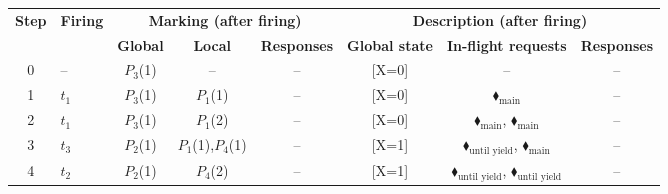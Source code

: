 \begin{table}[!htbp]
	\centering
	\label{tab:reach-seq}
	\begin{tabular}{c l c c c c c c}
		\toprule
		\textbf{Step} 
		& \textbf{Firing} 
		& \multicolumn{3}{c}{\textbf{Marking (after firing)}} 
		& \multicolumn{3}{c}{\textbf{Description (after firing)}} \\
		\cmidrule(lr){3-5} \cmidrule(lr){6-8}
		& 
		& \textbf{Global} 
		& \textbf{Local} 
		& \textbf{Responses} 
		& \textbf{Global state} 
		& \textbf{In-flight requests} 
		& \textbf{Responses} \\
		\midrule
		0 & --                                  
		& {\color{blue}$P_3$(1)}                  
		& --                                    
		& --                                    
		& {\color{blue}[X=0]}                   
		& --                          
		& --                                    \\
		1 & $t_1$ 
		& {\color{blue}$P_3$(1)}                  
		& $P_1$(1)                                
		& --                                    
		& {\color{blue}[X=0]}                   
		& {\color{ForestGreen}$\blacklozenge_\text{main}$} 
		& --                                    \\
		2 & $t_1$ 
		& {\color{blue}$P_3$(1)}                  
		& $P_1$(2)                                
		& --                                    
		& {\color{blue}[X=0]}                   
		& {\color{ForestGreen}$\blacklozenge_\text{main}$}, {\color{ForestGreen}$\blacklozenge_\text{main}$}  
		& --                                    \\
		3 & $t_3$                                  
		& {\color{blue}$P_2$(1)}                  
		& $P_1$(1),$P_4$(1)                          
		& --                                   
		&                                    {\color{blue}[X=1]}    
		&                                    {\color{black}$\blacklozenge_\text{until yield}$}, {\color{ForestGreen}$\blacklozenge_\text{main}$}   
		& --                                    \\
		4 & $t_2$                                  
		& {\color{blue}$P_2$(1)}                  
		& $P_4$(2)                                
		& --                                    
		&                                    {\color{blue}[X=1]}    
		&                                    {\color{black}$\blacklozenge_\text{until yield}$}, {\color{black}$\blacklozenge_\text{until yield}$}   
		& --                                    \\

\end{tabular}
\end{table}
